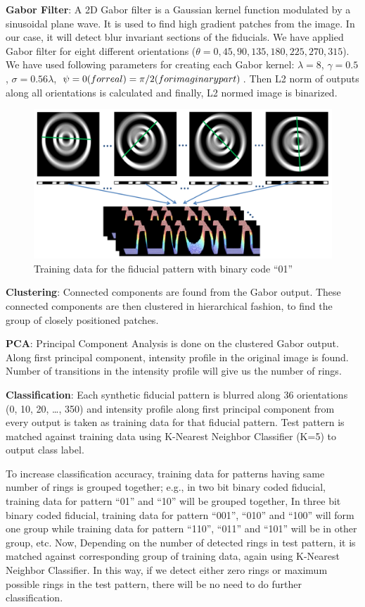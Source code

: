\documentclass[runningheads]{llncs}
\begin{document}
\textbf{Gabor Filter}: A 2D Gabor filter is a Gaussian kernel function modulated
by a sinusoidal plane wave. It is used to find high gradient patches from the
image. In our case, it will detect blur invariant sections of the fiducials. We
have applied Gabor filter for eight different orientations ($\theta = 0, 45,
90, 135, 180, 225, 270, 315$). We have used following parameters for
creating each Gabor kernel: $\lambda = 8$, $\gamma = 0.5$, $\sigma =
0.56\lambda$, $\psi = 0 \text(for real) = \pi/2 (for imaginary part)$. 
Then L2 norm of outputs along all orientations is calculated and finally, L2
normed image is binarized.

\begin{figure}
\centering
  \includegraphics[width=\linewidth]{training_data.pdf}  
  \caption{Training data for the fiducial pattern with binary code ``01''}
\end{figure}

\textbf{Clustering}: Connected components are found from the Gabor output.
These connected components are then clustered in hierarchical fashion, to find
the group of closely positioned patches.

\textbf{PCA}: Principal Component Analysis is done on the clustered Gabor
output. Along first principal component, intensity profile in the original image
is found. Number of transitions in the intensity profile will give us the
number of rings.

\textbf{Classification}: Each synthetic fiducial pattern is blurred along 36
orientations (0, 10, 20, \ldots , 350) and intensity profile along first
principal component from every output is taken as training data for that
fiducial pattern. Test pattern is matched against training data using 
K-Nearest Neighbor Classifier (K=5) to output class label.

To increase classification accuracy, training data for patterns having same
number of rings is grouped together; e.g., in two bit binary coded fiducial,
training data for pattern ``01'' and ``10'' will be grouped together, In three
bit binary coded fiducial, training data for pattern “001”, “010” and “100” will
form one group while training data for pattern “110”, “011” and “101” will be
in other group, etc. Now, Depending on the number of detected rings in test
pattern, it is matched against corresponding group of training data, again
using  K-Nearest Neighbor Classifier. In this way, if we detect either zero
rings or maximum possible rings in the test pattern, there will be no need to do
further classification.
\end{document}
